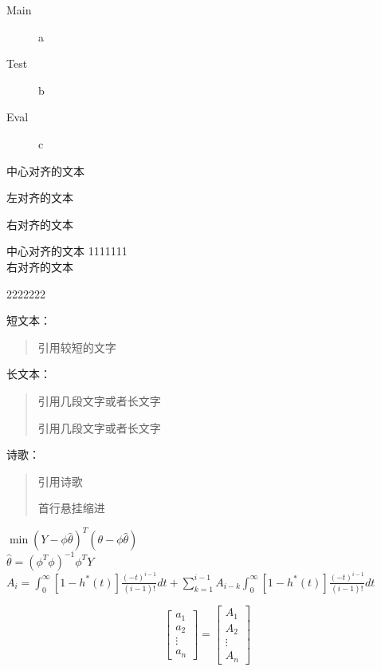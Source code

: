 \documentclass{ctexart}
\begin{document}
\begin{description}
\item[Main] a
\item[Test] b
\item[Eval] c  
\end{description}

\begin{center}
    中心对齐的文本
\end{center}

\begin{flushleft}
    左对齐的文本
\end{flushleft}

\begin{flushright}
    右对齐的文本
\end{flushright}

\centering 中心对齐的文本
1111111 \\
\raggedleft
右对齐的文本 \\
\raggedright
2222222 \par
短文本：
\begin{quote}
    引用较短的文字
\end{quote}
长文本：
\begin{quotation}
引用几段文字或者长文字

引用几段文字或者长文字
\end{quotation}
诗歌：
\begin{verse}
    引用诗歌

    首行悬挂缩进

\end{verse}

\begin{center}
    $ \min(Y-\phi\widehat{\theta})^{T}(\theta-\phi\widehat{\theta}) $\\
    $ \widehat{\theta}=(\phi^{T}\phi)^{-1}\phi^{T}Y   $\\
    $ A_i=\int_0^\infty [1-h^{*}(t)]\frac{(-t)^{i-1}}{(i-1)!}dt+\sum_{k=1}^{i-1} A_{i-k} \int_0^\infty [1-h^{*}(t)]\frac{(-t)^{i-1}}{(i-1)!} dt$

\end{center}

\begin{equation*}
\begin{bmatrix}a_1 \\ a_2 \\\vdots \\ a_n\end{bmatrix}=\begin{bmatrix}A_1 \\ A_2 \\\vdots \\ A_n\end{bmatrix}
\end{equation*}
\end{document}
